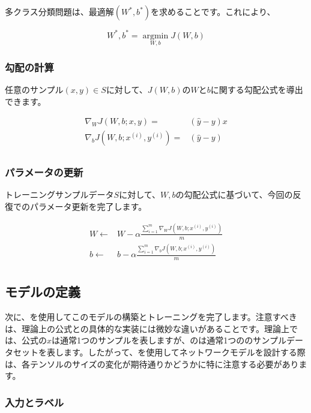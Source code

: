\begin{content}
\begin{content}
多クラス分類問題は、最適解$(W^*,b^*)$を求めることです。これにより、

\[W^*,b^* = \mathop {\arg \min }\limits_{W,b} J(W,b)\]

\subsubsection{勾配の計算}

任意のサンプル$ (x,y) \in S $に対して、$ J(W,b) $の$ W $と$ b $に関する勾配公式を導出できます。

\[\begin{aligned}
  {\nabla _W}J\left( {W,b;x,y} \right) =  & \left( {\widehat y - y} \right)x \\ 
  {\nabla _b}J\left( {W,b;{x^{(i)}},{y^{(i)}}} \right) =  & \left( {\widehat y - y} \right) \\ 
\end{aligned} \]


\subsubsection{パラメータの更新}

トレーニングサンプルデータ$ S $に対して、$W, b$の勾配公式に基づいて、今回の反復でのパラメータ更新を完了します。

\[\begin{aligned}
  W \leftarrow  & W - \alpha \frac{{\sum\limits_{i = 1}^m {{\nabla _W}J\left( {W,b;{x^{(i)}},{y^{(i)}}} \right)} }}{m} \\ 
  b \leftarrow  & b - \alpha \frac{{\sum\limits_{i = 1}^m {{\nabla _b}J\left( {W,b;{x^{(i)}},{y^{(i)}}} \right)} }}{m} \\ 
\end{aligned} \]

\subsection{モデルの定義}

次に、\tf{}を使用してこのモデルの構築とトレーニングを完了します。注意すべきは、理論上の公式と\tf{}の具体的な実装には微妙な違いがあることです。理論上では、公式の$x$は通常1つのサンプルを表しますが、\tf{}のは通常1つののサンプルデータセットを表します。したがって、\tf{}を使用してネットワークモデルを設計する際は、各テンソルのサイズの変化が期待通りかどうかに特に注意する必要があります。

\subsubsection{入力とラベル}


\end{content}
\end{content}
